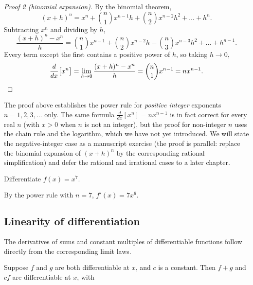 \begin{proof}[Proof 2 (binomial expansion)]
By the binomial theorem,
\[
(x + h)^{n} = x^{n} + \binom{n}{1} x^{n - 1} h + \binom{n}{2} x^{n - 2} h^{2} + \dots + h^{n}.
\]
Subtracting \(x^{n}\) and dividing by \(h\),
\[
\frac{(x + h)^{n} - x^{n}}{h} = \binom{n}{1} x^{n - 1} + \binom{n}{2} x^{n - 2} h + \binom{n}{3} x^{n - 3} h^{2} + \dots + h^{n - 1}.
\]
Every term except the first contains a positive power of \(h\), so taking \(h \to 0\),
\[
\frac{d}{dx}\bigl[x^{n}\bigr]
= \lim_{h \to 0} \frac{(x + h)^{n} - x^{n}}{h}
= \binom{n}{1} x^{n - 1}
= n x^{n - 1}. \qedhere
\]
\end{proof}

\begin{caution}
The proof above establishes the power rule for \emph{positive integer} exponents \(n = 1, 2, 3, \dots\) only. The same formula \(\frac{d}{dx}[x^{n}] = n x^{n - 1}\) is in fact correct for every real \(n\) (with \(x > 0\) when \(n\) is not an integer), but the proof for non-integer \(n\) uses the chain rule and the logarithm, which we have not yet introduced. We will state the negative-integer case as a manuscript exercise (the proof is parallel: replace the binomial expansion of \((x + h)^{n}\) by the corresponding rational simplification) and defer the rational and irrational cases to a later chapter.
\end{caution}

\begin{workedexample}
\begin{example}
Differentiate \(f(x) = x^{7}\).
\end{example}

\begin{solution}
By the power rule with \(n = 7\), \(f'(x) = 7 x^{6}\).
\end{solution}
\end{workedexample}

\subsection{Linearity of differentiation}

The derivatives of sums and constant multiples of differentiable functions follow directly from the corresponding limit laws.

\begin{theorem}[Linearity]\label{thm:differentiation-linearity}
Suppose \(f\) and \(g\) are both differentiable at \(x\), and \(c\) is a constant. Then \(f + g\) and \(c f\) are differentiable at \(x\), with
\end{theorem}


